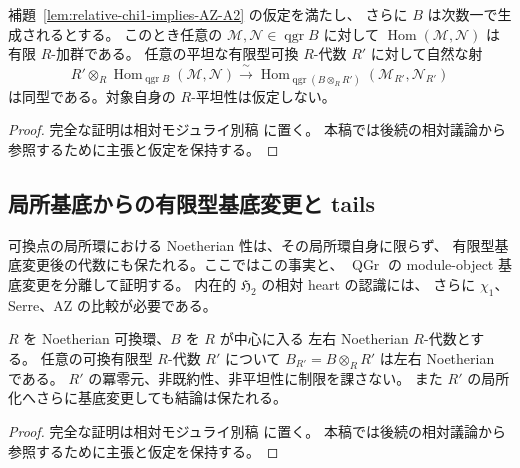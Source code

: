 \begin{lemma}
\label{lem:chi1-qgr-hom-finite-flat}
補題~\ref{lem:relative-chi1-implies-AZ-A2} の仮定を満たし、
さらに $B$ は次数一で生成されるとする。
このとき任意の $\mathcal M,\mathcal N\in\operatorname{qgr}B$ に対して
$\operatorname{Hom}(\mathcal M,\mathcal N)$ は有限 $R$-加群である。
任意の平坦な有限型可換 $R$-代数 $R'$ に対して自然な射
\[
 R'\otimes_R\operatorname{Hom}_{\operatorname{qgr}B}
      (\mathcal M,\mathcal N)
 \xrightarrow{\ \sim\ }
 \operatorname{Hom}_{\operatorname{qgr}(B\otimes_RR')}
      (\mathcal M_{R'},\mathcal N_{R'})
 \tag{Hom-flat-BC}\label{eq:qgr-hom-flat-basechange}
\]
は同型である。対象自身の $R$-平坦性は仮定しない。
\end{lemma}
\begin{proof}
完全な証明は相対モジュライ別稿
\cite[相対Koszul・Noetherian基底変更・tailsの節]{QuadricModuli2026} に置く。
本稿では後続の相対議論から参照するために主張と仮定を保持する。
\end{proof}

\subsection{局所基底からの有限型基底変更と tails}

可換点の局所環における Noetherian 性は、その局所環自身に限らず、
有限型基底変更後の代数にも保たれる。ここではこの事実と、
$\operatorname{QGr}$ の module-object 基底変更を分離して証明する。
内在的 $\mathfrak H_2$ の相対 heart の認識には、
さらに $\chi_1$、Serre、AZ の比較が必要である。

\begin{lemma}
\label{lem:local-finite-type-strong-noetherian}
$R$ を Noetherian 可換環、$B$ を $R$ が中心に入る
左右 Noetherian $R$-代数とする。
任意の可換有限型 $R$-代数 $R'$ について
$B_{R'}=B\otimes_RR'$ は左右 Noetherian である。
$R'$ の冪零元、非既約性、非平坦性に制限を課さない。
また $R'$ の局所化へさらに基底変更しても結論は保たれる。
\end{lemma}
\begin{proof}
完全な証明は相対モジュライ別稿
\cite[相対Koszul・Noetherian基底変更・tailsの節]{QuadricModuli2026} に置く。
本稿では後続の相対議論から参照するために主張と仮定を保持する。
\end{proof}

